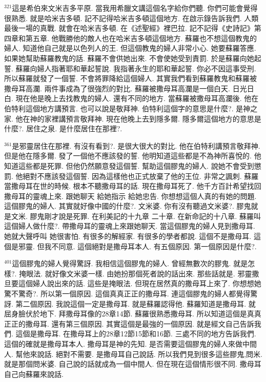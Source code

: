 \documentclass{book}
\begin{document}
$^{321}$這是希伯來文米吉多平原.
當我用希臘文講這個名字給你們聽.
你們可能會覺得很熟悉.
就是哈米吉多頓.
記不記得哈米吉多頓這個地方.
在啟示錄告訴我們.
人類最後一場的真戰.
就會在哈米吉多頓.
在《述聖經》裡巴拉.
記不記得《史詩記》第四章和第五章.
他戰勝他的敵人也在哈米吉多頓這個地方.
蘇羅也不想這個教鬼的婦人.
知道他自己就是以色列人的王.
但這個教鬼的婦人非常小心.
她要蘇羅答應.
如果她幫助蘇羅教鬼的話.
蘇羅不會供她出來.
不會使她受到責罰.
於是蘇羅向她起誓.
蘇羅向婦人指著耶和華起誓說.
我指著永生的耶和華起誓.
你必不因這事受刑.
所以蘇羅就發了一個誓.
不會將罪降給這個婦人.
其實我們看到蘇羅教鬼和蘇羅被撒母耳高瀾.
兩件事成為了很強烈的對比.
蘇羅被撒母耳高瀾是一個白天.
日光日白.
現在他是晚上去找教鬼的婦人.
還有不同的地方.
當蘇羅被撒母耳高瀾後.
他在伯特利這個地方講預言.
也可以說是敬拜神.
伯特利這個字的意思是什麼?.
是神之家.
他在神的家裡講預言敬拜神.
現在他晚上去到隱多爾.
隱多爾這個地方的意思是什麼?.
居住之泉.
是什麼居住在那裡?.

$^{361}$是邪靈居住在那裡.
有沒有看到?.
是很大很大的對比.
他在伯特利講預言敬拜神.
但是他在隱多爾.
發了一個他不應該發的誓.
他明知道這些都是不為神所喜悅的.
他知道這些都是死罪.
但他仍然願意發這個誓.
幫助這個膠鬼的婦人.
說她不會受到懲罰.
他絕對不應該發這個誓.
因為這樣他也正式放棄了他的王位.
非常之諷刺.
蘇羅當撒母耳在世的時候.
根本不聽撒母耳的話.
現在撒母耳死了.
他千方百計希望找回撒母耳的靈魂上來.
跟她聊天 給她指示 給她忠告.
你想想這個人真的有她的問題.
這個膠鬼的婦人.
其實就好像中國的什麼?.
文米婆.
你有沒有聽過文米婆?.
膠鬼就是文米.
膠鬼剛才說是死罪.
在利美記的十九章 二十章.
在新命記的十八章.
蘇羅叫這個婦人做什麼?.
帶撒母耳的靈魂上來跟她聊天.
當這個膠鬼的婦人見到撒母耳.
她就大聲呼叫 她很害怕.
有很多的解經家.
有很多的學者都說.
這個不是撒母耳.
這個是邪靈.
但我不同意.
這個絕對是撒母耳本人.
有五個原因.
第一個原因是什麼?.

$^{401}$這個膠鬼的婦人覺得驚訝.
我相信這個膠鬼的婦人.
曾經無數次的膠鬼.
就是怎樣?.
掩眼法.
就好像文米婆一樣.
由她扮那個死者說的話出來.
那些話就是.
邪靈撒旦要這個婦人說出來的話.
這些是掩眼法.
但現在居然真的撒母耳上來了.
你想想她驚不驚奇?.
所以第一個原因.
這個真真正正的撒母耳.
連這個膠鬼的婦人都覺得驚訝.
第二個原因.
我說這個一定是撒母耳.
就是蘇羅認得他.
蘇羅知道是撒母耳.
就屈身臉伏於地下.
拜撒母耳像的28章14節.
蘇羅很熟悉撒母耳.
所以知道這個是真真正正的撒母耳.
還有第三個原因.
其實這個是最強的一個原因.
就是經文自己告訴我們.
這個是撒母耳.
在撒母耳上的28章12節15節和16節.
三處不同的地方告訴我們.
這個的確就是撒母耳本人.
撒母耳是神的先知.
是否需要這個膠鬼的婦人來做中間人.
幫他來說話.
絕對不需要.
是撒母耳自己說話.
所以我們見到很多這些膠鬼,問米.
就是那個問米婆.
自己說的話就成為一個中間人.
但在現在這個情形很不同.
撒母耳自己向蘇羅來說話.
\end{document}
